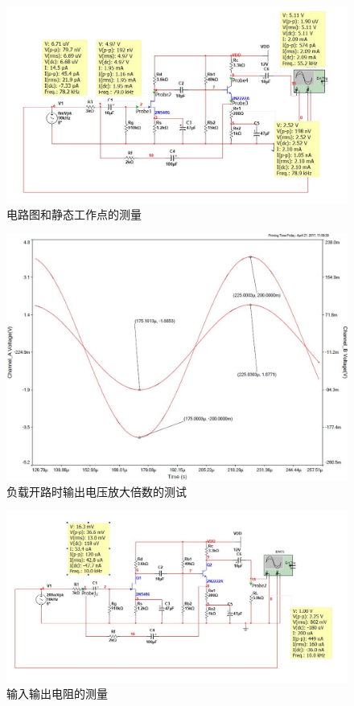 \documentclass[UTF8,a4paper]{ctexart}
\begin{document}
\begin{figure}
\centering
\includegraphics[width=\textwidth]{Q2.jpg}
\caption{电路图和静态工作点的测量}
\label{Q2}
\end{figure}
\begin{figure}
\centering
\includegraphics[width=\textwidth]{A2.jpg}
\caption{负载开路时输出电压放大倍数的测试}
\label{A2}
\end{figure}
\begin{figure}
\centering
\includegraphics[width=\textwidth]{R2.jpg}
\caption{输入输出电阻的测量}
\label{R2}
\end{figure}
\end{document}
